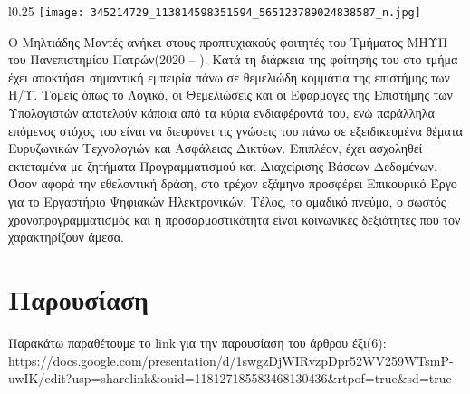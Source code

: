 \documentclass{report}
\begin{document}
 \begin{wrapfigure}{l}{0.25\textwidth} %
    \centering
    \texttt{[image: 345214729\_113814598351594\_565123789024838587\_n.jpg]}
\end{wrapfigure}
Ο Μηλτιάδης Μαντές ανήκει στους προπτυχιακούς φοιτητές του Τμήματος ΜΗΥΠ του
Πανεπιστημίου Πατρών(2020 – ). Κατά τη διάρκεια της φοίτησής του στο τμήμα έχει
αποκτήσει σημαντική εμπειρία πάνω σε θεμελιώδη κομμάτια της επιστήμης των Η/Υ.
Τομείς όπως το Λογικό, οι Θεμελιώσεις και οι Εφαρμογές της Επιστήμης των
Υπολογιστών αποτελούν κάποια από τα κύρια ενδιαφέροντά του, ενώ παράλληλα
επόμενος στόχος του είναι να διευρύνει τις γνώσεις του πάνω σε εξειδικευμένα θέματα
Ευρυζωνικών Τεχνολογιών και Ασφάλειας Δικτύων. Επιπλέον, έχει ασχοληθεί
εκτεταμένα με ζητήματα Προγραμματισμού και Διαχείρισης Βάσεων Δεδομένων.
Όσον αφορά την εθελοντική δράση, στο τρέχον εξάμηνο προσφέρει Επικουρικό Έργο
για το Εργαστήριο Ψηφιακών Ηλεκτρονικών. Τέλος, το ομαδικό πνεύμα, ο σωστός
χρονοπρογραμματισμός και η προσαρμοστικότητα είναι κοινωνικές δεξιότητες που
τον χαρακτηρίζουν άμεσα.



{\chapter{Παρουσίαση}}
Παρακάτω παραθέτουμε το  link  για την παρουσίαση του άρθρου έξι(6):\\  
https://docs.google.com/presentation/d/1swgzDjWIRvzpDpr52WV259WTsmP-uwIK/edit?usp=share\textunderscore link\&ouid=118127185583468130436&rtpof=true&sd=true
\end{document}
